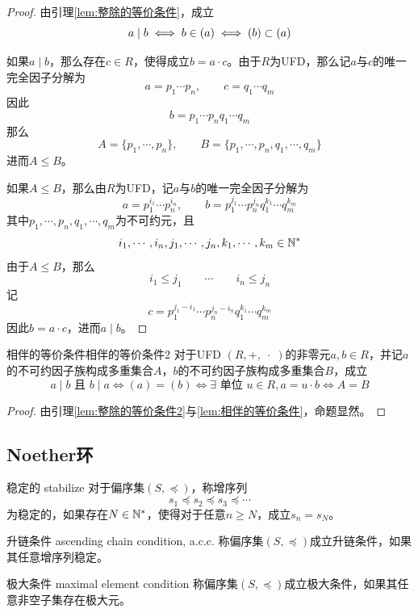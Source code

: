 \begin{proof}
	由引理\ref{lem:整除的等价条件}，成立
	$$
	a\mid b
	\iff b\in (a)
	\iff (b)\subset (a)
	$$
	
	如果$a\mid b$，那么存在$c\in R$，使得成立$b=a\cdot c$。由于$R$为UFD，那么记$a$与$c$的唯一完全因子分解为
	$$
	a=p_1\cdots p_n,\qquad 
	c=q_1\cdots q_m
	$$
	因此
	$$
	b=p_1\cdots p_nq_1\cdots q_m
	$$
	那么
	$$
	A=\{ p_1,\cdots ,p_n \},\qquad 
	B=\{ p_1,\cdots ,p_n ,q_1,\cdots ,q_m \}
	$$
	进而$A\le B$。
	
	如果$A\le B$，那么由$R$为UFD，记$a$与$b$的唯一完全因子分解为
	$$
	a=p_1^{i_1}\cdots p_n^{i_n},\qquad 
	b=p_1^{j_1}\cdots p_n^{j_n}q_1^{k_1}\cdots q_m^{k_m}
	$$
	其中$p_1,\cdots,p_n,q_1,\cdots,q_m$为不可约元，且
	$$
	i_1,\cdots,i_n,j_1,\cdots,j_n,k_1,\cdots,k_m\in\mathbb{N}^*
	$$
	由于$A\le B$，那么
	$$
	i_1\le j_1\qquad \cdots\qquad i_n\le j_n
	$$
	记
	$$
	c=p_1^{j_1-i_1}\cdots p_n^{j_n-i_n}q_1^{k_1}\cdots q_m^{k_m}
	$$
	因此$b=a\cdot c$，进而$a\mid b$。
\end{proof}

\begin{lemma}{相伴的等价条件}{相伴的等价条件2}
	对于UFD $(R,+,\;\cdot\;)$的非零元$a,b\in R$，并记$a$的不可约因子族构成多重集合$A$，$b$的不可约因子族构成多重集合$B$，成立
	$$
	a\mid b\text{ 且 }b\mid a
	\iff (a)=(b)
	\iff 
	\exists\text{ 单位 }u\in R,a=u\cdot b
	\iff A=B
	$$
\end{lemma}

\begin{proof}
	由引理\ref{lem:整除的等价条件2}与\ref{lem:相伴的等价条件}，命题显然。
\end{proof}

\subsection{Noether环}

\begin{definition}{稳定的 stabilize}
	对于偏序集$(S,\preceq)$，称增序列
	$$
	s_1\preceq s_2\preceq s_3\preceq\cdots
	$$
	为稳定的，如果存在$N\in\mathbb{N}^*$，使得对于任意$n\ge N$，成立$s_n=s_N$。
\end{definition}

\begin{definition}{升链条件 ascending chain condition, a.c.c.}
	称偏序集$(S,\preceq)$成立升链条件，如果其任意增序列稳定。
\end{definition}

\begin{definition}{极大条件 maximal element condition}
	称偏序集$(S,\preceq)$成立极大条件，如果其任意非空子集存在极大元。
\end{definition}

